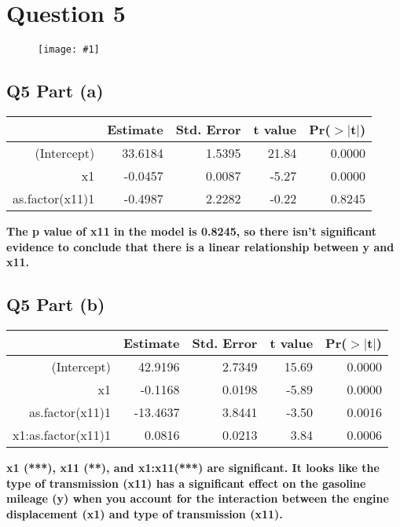 \documentclass{article}
\newcommand\bsc[2][\DefaultOpt]{%
  \def\DefaultOpt{#2}%
  \section[#1]{#2}%
}
\newcommand\ssc[2][\DefaultOpt]{%
  \def\DefaultOpt{#2}%
  \subsection[#1]{#2}%
}
\newcommand{\wimg}[1]{
\begin{figure}[h]
  \texttt{[image: \#1]}
\end{figure}
}
\begin{document}
\bsc{Question 5}{
\wimg{HW6Q5}
\ssc{Q5 Part (a)}{

\begin{table}[ht]
\centering
\begin{tabular}{rrrrr}
  \hline
 & Estimate & Std. Error & t value & Pr($>$$|$t$|$) \\ 
  \hline
(Intercept) & 33.6184 & 1.5395 & 21.84 & 0.0000 \\ 
  x1 & -0.0457 & 0.0087 & -5.27 & 0.0000 \\ 
  as.factor(x11)1 & -0.4987 & 2.2282 & -0.22 & 0.8245 \\ 
   \hline
\end{tabular}
\end{table}

\textbf{The p value of x11 in the model is 0.8245, so there isn't significant evidence to conclude that there is a linear relationship between y and x11.}

}
\ssc{Q5 Part (b)}{

\begin{table}[ht]
\centering
\begin{tabular}{rrrrr}
  \hline
 & Estimate & Std. Error & t value & Pr($>$$|$t$|$) \\ 
  \hline
(Intercept) & 42.9196 & 2.7349 & 15.69 & 0.0000 \\ 
  x1 & -0.1168 & 0.0198 & -5.89 & 0.0000 \\ 
  as.factor(x11)1 & -13.4637 & 3.8441 & -3.50 & 0.0016 \\ 
  x1:as.factor(x11)1 & 0.0816 & 0.0213 & 3.84 & 0.0006 \\ 
   \hline
\end{tabular}
\end{table}

\textbf{x1 (***), x11 (**), and x1:x11(***) are significant. It looks like the type of transmission (x11) has a significant effect on the gasoline mileage (y) when you account for the interaction between the engine displacement (x1) and type of transmission (x11).}

}
}
\end{document}
